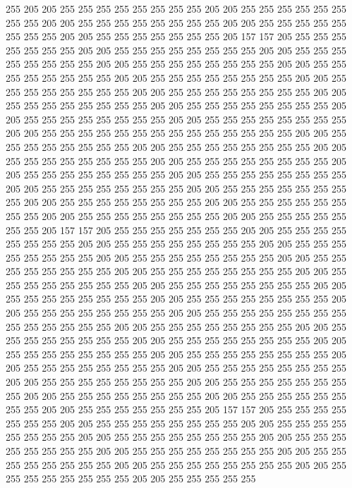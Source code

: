255 205 205 255 255 255 255 255 255 255 255 205 205 255 255 255 255 255 255 255
255 205 205 255 255 255 255 255 255 255 255 205 205 255 255 255 255 255 255 255
255 205 205 255 255 255 255 255 255 255 205 157 157 205 255 255 255 255 255 255
255 205 205 255 255 255 255 255 255 255 255 205 205 255 255 255 255 255 255 255
255 205 205 255 255 255 255 255 255 255 255 205 205 255 255 255 255 255 255 255
255 205 205 255 255 255 255 255 255 255 255 205 205 255 255 255 255 255 255 255
255 205 205 255 255 255 255 255 255 255 255 205 205 255 255 255 255 255 255 255
255 205 205 255 255 255 255 255 255 255 255 205 205 255 255 255 255 255 255 255
255 205 205 255 255 255 255 255 255 255 255 205 205 255 255 255 255 255 255 255
255 255 255 255 255 255 255 205 205 255 255 255 255 255 255 255 255 205 205 255
255 255 255 255 255 255 255 205 205 255 255 255 255 255 255 255 255 205 205 255
255 255 255 255 255 255 255 205 205 255 255 255 255 255 255 255 255 205 205 255
255 255 255 255 255 255 255 205 205 255 255 255 255 255 255 255 255 205 205 255
255 255 255 255 255 255 255 205 205 255 255 255 255 255 255 255 255 205 205 255
255 255 255 255 255 255 255 205 205 255 255 255 255 255 255 255 255 205 205 255
255 255 255 255 255 255 205 157 157 205 255 255 255 255 255 255 255 205 205 255
255 255 255 255 255 255 255 205 205 255 255 255 255 255 255 255 255 205 205 255
255 255 255 255 255 255 255 205 205 255 255 255 255 255 255 255 255 205 205 255
255 255 255 255 255 255 255 205 205 255 255 255 255 255 255 255 255 205 205 255
255 255 255 255 255 255 255 205 205 255 255 255 255 255 255 255 255 205 205 255
255 255 255 255 255 255 255 205 205 255 255 255 255 255 255 255 255 205 205 255
255 255 255 255 255 255 255 205 205 255 255 255 255 255 255 255 255 255 255 255
255 255 255 205 205 255 255 255 255 255 255 255 255 205 205 255 255 255 255 255
255 255 255 205 205 255 255 255 255 255 255 255 255 205 205 255 255 255 255 255
255 255 255 205 205 255 255 255 255 255 255 255 255 205 205 255 255 255 255 255
255 255 255 205 205 255 255 255 255 255 255 255 255 205 205 255 255 255 255 255
255 255 255 205 205 255 255 255 255 255 255 255 255 205 205 255 255 255 255 255
255 255 255 205 205 255 255 255 255 255 255 255 255 205 205 255 255 255 255 255
255 255 205 157 157 205 255 255 255 255 255 255 255 205 205 255 255 255 255 255
255 255 255 205 205 255 255 255 255 255 255 255 255 205 205 255 255 255 255 255
255 255 255 205 205 255 255 255 255 255 255 255 255 205 205 255 255 255 255 255
255 255 255 205 205 255 255 255 255 255 255 255 255 205 205 255 255 255 255 255
255 255 255 205 205 255 255 255 255 255 255 255 255 205 205 255 255 255 255 255
